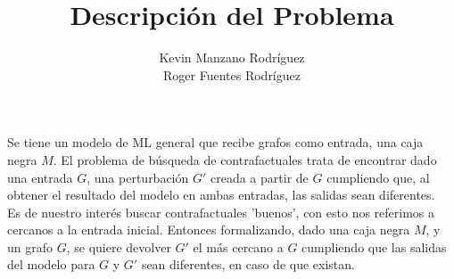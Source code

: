 \documentclass[a4paper]{article}
\title{Descripción del Problema}
\author{Kevin Manzano Rodr\'iguez \\ Roger Fuentes Rodr\'iguez}
\date{}
\begin{document}
\maketitle

Se tiene un modelo de ML general que recibe grafos como entrada, una caja negra $M$. El problema de b\'usqueda
de contrafactuales trata de encontrar dado una entrada $G$, una perturbaci\'on $G'$ creada a partir de $G$ cumpliendo que, al obtener el resultado del modelo en ambas entradas, las salidas sean diferentes.
\\
Es de nuestro inter\'es buscar contrafactuales 'buenos', con esto nos referimos a cercanos a la entrada inicial. Entonces formalizando, dado una caja negra $M$, y un grafo $G$, se quiere devolver $G'$ el m\'as cercano a $G$ cumpliendo que las salidas del modelo para $G$ y $G'$ sean diferentes, en caso de que existan.
\end{document}
